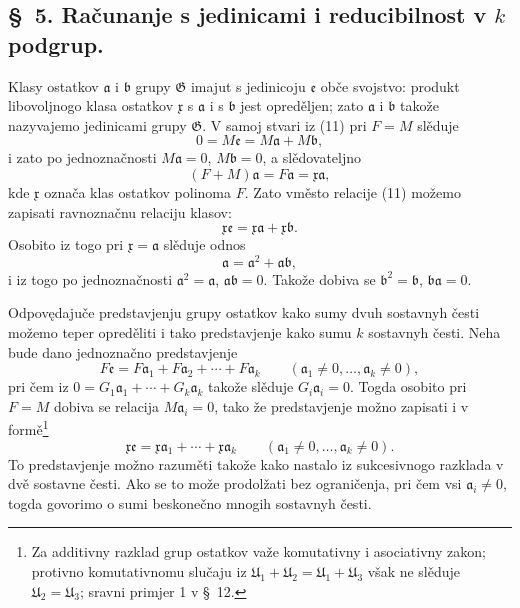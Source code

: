 \documentclass[11pt]{article}
\providecommand{\mG}{\mathfrak G}
\providecommand{\mU}{\mathfrak U}
\providecommand{\ma}{\mathfrak a}
\providecommand{\mb}{\mathfrak b}
\providecommand{\me}{\mathfrak e}
\providecommand{\mx}{\mathfrak x}
\begin{document}

\setcounter{footnote}{11}
\subsection*{\S~5. Računanje s jedinicami i reducibilnost v \(k\) podgrup.}

Klasy ostatkov \(\ma\) i \(\mb\) grupy \(\mG\) imajut s jedinicoju \(\me\) obče svojstvo: produkt libovoljnogo klasa ostatkov \(\mx\) s \(\ma\) i s \(\mb\) jest opreděljen; zato \(\ma\) i \(\mb\) takože nazyvajemo jedinicami grupy \(\mG\). V samoj stvari iz (11) pri \(F=M\) slěduje
\[
 0=M\me=M\ma+M\mb,
\]
i zato po jednoznačnosti \(M\ma=0\), \(M\mb=0\), a slědovateljno
\[
 (F+M)\ma=F\ma=\mx\ma,
\]
kde \(\mx\) označa klas ostatkov polinoma \(F\). Zato vměsto relacije (11) možemo zapisati ravnoznačnu relaciju klasov:
\[
 \mx\me=\mx\ma+\mx\mb.
\]
Osobito iz togo pri \(\mx=\ma\) slěduje odnos
\[
 \ma=\ma^2+\ma\mb,
\]
i iz togo po jednoznačnosti \(\ma^2=\ma\), \(\ma\mb=0\). Takože dobiva se \(\mb^2=\mb\), \(\mb\ma=0\).

Odpovędajuče predstavjenju grupy ostatkov kako sumy dvuh sostavnyh česti možemo teper opreděliti i tako predstavjenje kako sumu \(k\) sostavnyh česti. Neha bude dano jednoznačno predstavjenje
\[
 F\me=F\ma_1+F\ma_2+\cdots+F\ma_k\qquad(\ma_1\ne0,\ldots,\ma_k\ne0),
\]
pri čem iz \(0=G_1\ma_1+\cdots+G_k\ma_k\) takože slěduje \(G_i\ma_i=0\). Togda osobito pri \(F=M\) dobiva se relacija \(M\ma_i=0\), tako že predstavjenje možno zapisati i v formě\footnote{Za additivny razklad grup ostatkov važe komutativny i asociativny zakon; protivno komutativnomu slučaju iz \(\mU_1+\mU_2=\mU_1+\mU_3\) však ne slěduje \(\mU_2=\mU_3\); sravni primjer 1 v \S~12.}
\begin{equation}
 \mx\me=\mx\ma_1+\cdots+\mx\ma_k\qquad(\ma_1\ne0,\ldots,\ma_k\ne0).
\tag{12}
\end{equation}
To predstavjenje možno razuměti takože kako nastalo iz sukcesivnogo razklada v dvě sostavne česti. Ako se to može prodolžati bez ograničenja, pri čem vsi \(\ma_i\ne0\), togda govorimo o sumi beskonečno mnogih sostavnyh česti.
\end{document}
